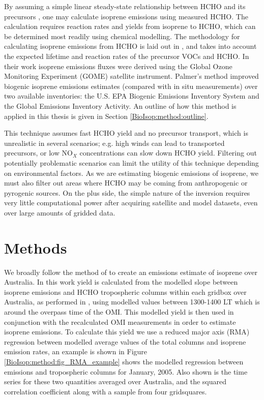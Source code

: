       By assuming a simple linear steady-state relationship between HCHO and its precursors \parencite{Palmer2003, Palmer2006, Millet2006}, one may calculate isoprene emissions using measured HCHO.
      The calculation requires reaction rates and yields from isoprene to HCHO, which can be determined most readily using chemical modelling.
      The methodology for calculating isoprene emissions from HCHO is laid out in \textcite{Palmer2003}, and takes into account the expected lifetime and reaction rates of the precursor VOCs and HCHO.
      In their work isoprene emissions fluxes were derived using the Global Ozone Monitoring Experiment (GOME) satellite instrument.
      Palmer's method improved biogenic isoprene emissions estimates (compared with in situ measurements) over two available inventories: the U.S. EPA Biogenic Emissions Inventory System and the Global Emissions Inventory Activity. %
      An outline of how this method is applied in this thesis is given in Section \ref{BioIsop:method:outline}.
      
      This technique assumes fast HCHO yield and no precursor transport, which is unrealistic in several scenarios; e.g. high winds can lead to transported precursors, or low NO$_X$ concentrations can slow down HCHO yield.
      Filtering out potentially problematic scenarios can limit the utility of this technique depending on environmental factors.
      As we are estimating biogenic emissions of isoprene, we must also filter out areas where HCHO may be coming from anthropogenic or pyrogenic sources.
      On the plus side, the simple nature of the inversion requires very little computational power after acquiring satellite and model datasets, even over large amounts of gridded data.
      
    
\section{Methods}
  \label{BioIsop:method}
  
  
  We broadly follow the method of \textcite{Palmer2001} to create an emissions estimate of isoprene over Australia.
  In this work yield is calculated from the modelled slope between isoprene emissions and HCHO tropospheric columns within each gridbox over Australia, as performed in \textcite{Palmer2003}, using modelled values between 1300-1400 LT which is around the overpass time of the OMI.
  This modelled yield is then used in conjunction with the recalculated OMI measurements in order to estimate isoprene emissions.
  To calculate this yield we use a reduced major axis (RMA) regression between modelled average values of the total columns and isoprene emission rates, an example is shown in Figure \ref{BioIsop:method:fig_RMA_example} shows the modelled regression between emissions and tropospheric columns for January, 2005. Also shown is the time series for these two quantities averaged over Australia, and the squared correlation coefficient along with a sample from four gridsquares.
  
